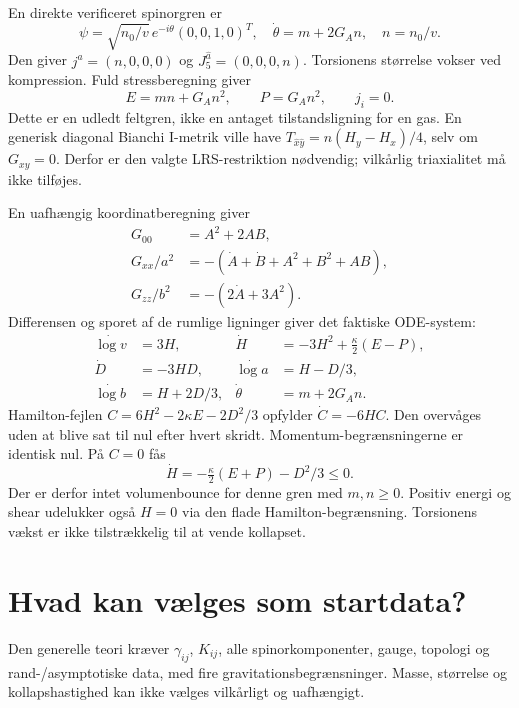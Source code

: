 \documentclass[11pt,a4paper]{article}
\begin{document}
En direkte verificeret spinorgren er
\begin{equation}
 \psi=\sqrt{n_0/v}\,e^{-i\theta}(0,0,1,0)^T,
 \quad \dot\theta=m+2G_A n,\quad n=n_0/v.
\end{equation}
Den giver $j^{\hat a}=(n,0,0,0)$ og $J_5^{\hat a}=(0,0,0,n)$. Torsionens størrelse vokser ved kompression. Fuld stressberegning giver
\begin{equation}
 E=mn+G_A n^2,\qquad P=G_A n^2,\qquad j_i=0.
\end{equation}
Dette er en udledt feltgren, ikke en antaget tilstandsligning for en gas. En generisk diagonal Bianchi I-metrik ville have $T_{\hat x\hat y}=n(H_y-H_x)/4$, selv om $G_{xy}=0$. Derfor er den valgte LRS-restriktion nødvendig; vilkårlig triaxialitet må ikke tilføjes.

En uafhængig koordinatberegning giver
\begin{align}
 G_{00}&=A^2+2AB,\\
 G_{xx}/a^2&=-(\dot A+\dot B+A^2+B^2+AB),\\
 G_{zz}/b^2&=-(2\dot A+3A^2).
\end{align}
Differensen og sporet af de rumlige ligninger giver det faktiske ODE-system:
\begin{align}
 \dot{\log v}&=3H,& \dot H&=-3H^2+\tfrac\kappa2(E-P),\\
 \dot D&=-3HD,& \dot{\log a}&=H-D/3,\\
 \dot{\log b}&=H+2D/3,& \dot\theta&=m+2G_A n.
\end{align}
Hamilton-fejlen $C=6H^2-2\kappa E-2D^2/3$ opfylder $\dot C=-6HC$. Den overvåges uden at blive sat til nul efter hvert skridt. Momentum-begrænsningerne er identisk nul. På $C=0$ fås
\begin{equation}
 \boxed{\dot H=-\tfrac\kappa2(E+P)-D^2/3\leq0.}
\end{equation}
Der er derfor intet volumenbounce for denne gren med $m,n\geq0$. Positiv energi og shear udelukker også $H=0$ via den flade Hamilton-begrænsning. Torsionens vækst er ikke tilstrækkelig til at vende kollapset.

\section{Hvad kan vælges som startdata?}
Den generelle teori kræver $\gamma_{ij}$, $K_{ij}$, alle spinorkomponenter, gauge, topologi og rand-/asymptotiske data, med fire gravitationsbegrænsninger. Masse, størrelse og kollapshastighed kan ikke vælges vilkårligt og uafhængigt.
\end{document}
